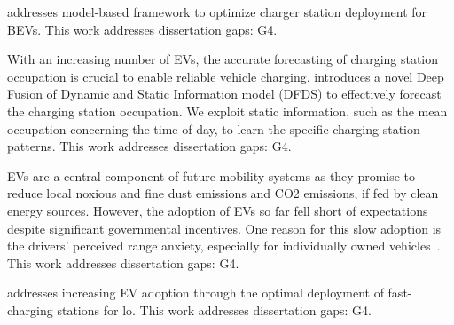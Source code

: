 \documentclass[letterpaper, 12pt, oneside, doublespacing]{Thesis}
\begin{document}
\noindent \cite{model-based_framework_2022} addresses model-based framework to optimize charger station deployment for BEVs. This work addresses dissertation gaps: G4.



\noindent With an increasing number of EVs, the accurate forecasting of charging station occupation is crucial to enable reliable vehicle charging. \cite{deep_information_2021} introduces a novel Deep Fusion of Dynamic and Static Information model (DFDS) to effectively forecast the charging station occupation. We exploit static information, such as the mean occupation concerning the time of day, to learn the specific charging station patterns. This work addresses dissertation gaps: G4.



\noindent EVs are a central component of future mobility systems as they promise to reduce local noxious and fine dust emissions and CO2 emissions, if fed by clean energy sources. However, the adoption of EVs so far fell short of expectations despite significant governmental incentives. One reason for this slow adoption is the drivers' perceived range anxiety, especially for individually owned vehicles~\cite{electric_vehicle_2020}. This work addresses dissertation gaps: G4.



\noindent \cite{increasing_electric_2020} addresses increasing EV adoption through the optimal deployment of fast-charging stations for lo. This work addresses dissertation gaps: G4.
\end{document}
